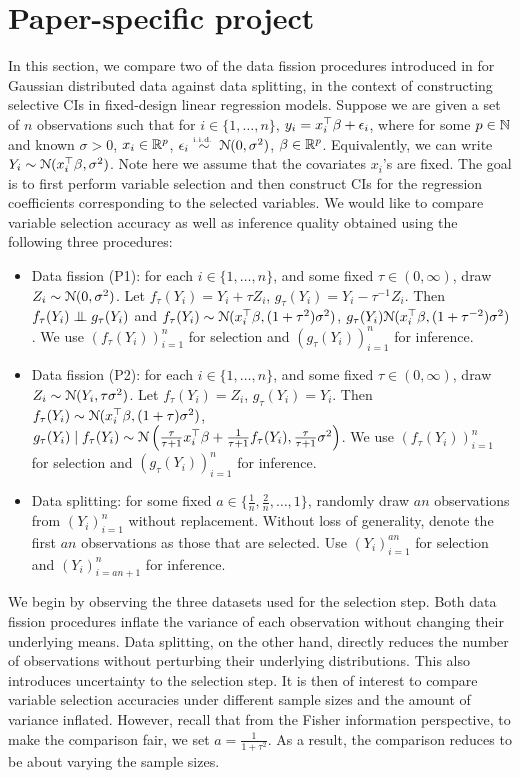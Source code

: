 \section{Paper-specific project}\label{sec:project}
In this section, we compare two of the data fission procedures introduced in \cite{leiner2022data} for Gaussian distributed data against data splitting, in the context of constructing selective CIs in fixed-design linear regression models. Suppose we are given a set of $n$ observations such that for $i\in\{1,\dots,n\}$, $y_i = x_i^\top \beta + \epsilon_i$,
where for some $p\in\mathbb{N}$ and known $\sigma>0$, $x_i\in\mathbb{R}^p$, $\epsilon_i\overset{\textrm{\tiny i.i.d.\ }}{\sim} \mathcal{N}(0,\sigma^2)$, $\beta\in\mathbb{R}^p$. Equivalently, we can write $Y_i\sim\mathcal{N}(x_i^\top\beta, \sigma^2)$. Note here we assume that the covariates $x_i$'s are fixed. The goal is to first perform variable selection and then construct CIs for the regression coefficients corresponding to the selected variables. We would like to compare variable selection accuracy as well as inference quality obtained using the following three procedures:
\begin{itemize}
\item Data fission (P1): for each $i\in\{1,\dots,n\}$, and some fixed $\tau\in(0,\infty)$, draw $Z_i\sim\mathcal{N}(0,\sigma^2)$. Let $f_\tau(Y_i) = Y_i + \tau Z_i$, $g_\tau(Y_i) = Y_i - \tau^{-1}Z_i$. Then $f_\tau(Y_i)\indep g_\tau(Y_i)$ and $f_\tau(Y_i)\sim\mathcal{N}(x_i^\top\beta, (1+\tau^2)\sigma^2)$, $g_\tau(Y_i)\mathcal{N}(x_i^\top\beta, (1+\tau^{-2})\sigma^2)$. We use $(f_\tau(Y_i))_{i=1}^n$ for selection and $(g_\tau(Y_i))_{i=1}^n$ for inference.
\item Data fission (P2): for each $i\in\{1,\dots,n\}$, and some fixed $\tau\in(0,\infty)$, draw $Z_i\sim\mathcal{N}(Y_i,\tau\sigma^2)$. Let $f_\tau(Y_i) = Z_i$, $g_\tau(Y_i) = Y_i$. Then $f_\tau(Y_i)\sim\mathcal{N}(x_i^\top\beta, (1+\tau)\sigma^2)$, $g_\tau(Y_i)\mid f_\tau(Y_i)\sim\mathcal{N}\left(\frac{\tau}{\tau+1}x_i^\top\beta + \frac{1}{\tau+1}f_\tau(Y_i), \frac{\tau}{\tau+1}\sigma^2\right)$. We use $(f_\tau(Y_i))_{i=1}^n$ for selection and $(g_\tau(Y_i))_{i=1}^n$ for inference.
\item Data splitting: for some fixed $a\in\{\frac{1}{n}, \frac{2}{n}, \dots, 1\}$, randomly draw $an$ observations from $(Y_i)_{i=1}^n$ without replacement. Without loss of generality, denote the first $an$ observations as those that are selected. Use $(Y_i)_{i=1}^{an}$ for selection and $(Y_i)_{i=an+1}^n$ for inference.
\end{itemize}
We begin by observing the three datasets used for the selection step. Both data fission procedures inflate the variance of each observation without changing their underlying means. Data splitting, on the other hand, directly reduces the number of observations without perturbing their underlying distributions. This also introduces uncertainty to the selection step. It is then of interest to compare variable selection accuracies under different sample sizes and the amount of variance inflated. However, recall that from the Fisher information perspective, to make the comparison fair, we set $a = \frac{1}{1+\tau^2}$. As a result, the comparison reduces to be about varying the sample sizes.

